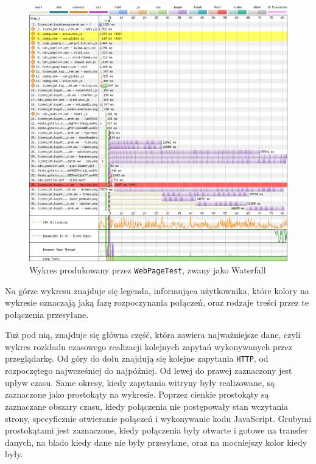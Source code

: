 \documentclass[licencjacka]{pracadypl}
\begin{document}
\begin{figure}[H]
  \centering
  \includegraphics[width=\linewidth/\real{1.08}]{images/base-waterfall-all-final.png}
  \caption{Wykres produkowany przez \texttt{WebPageTest}, zwany jako Waterfall}
  \label{fig:waterfall-base}
\end{figure}

Na górze wykresu znajduje się legenda, informująca użytkownika, które kolory na wykresie oznaczają jaką fazę rozpoczynania połączeń, oraz rodzaje treści przez te połączenia przesyłane. 

Tuż pod nią, znajduje się główna część, która zawiera najważniejsze dane, czyli wykres rozkładu czasowego realizacji kolejnych zapytań wykonywanych przez przeglądarkę. Od góry do dołu znajdują się kolejne zapytania \texttt{HTTP}, od rozpoczętego najwcześniej do najpóźniej. Od lewej do prawej zaznaczony jest upływ czasu. Same okresy, kiedy zapytania witryny były realizowane, są zaznaczone jako prostokąty na wykresie. Poprzez cienkie prostokąty są zaznaczane obszary czasu, kiedy połączenia nie postępowały stan wczytania strony, specyficznie otwieranie połączeń i wykonywanie kodu JavaScript. Grubymi prostokątami jest zaznaczone, kiedy połączenia były otwarte i gotowe na transfer danych, na blado kiedy dane nie były przesyłane, oraz na mocniejszy kolor kiedy były.
\end{document}
